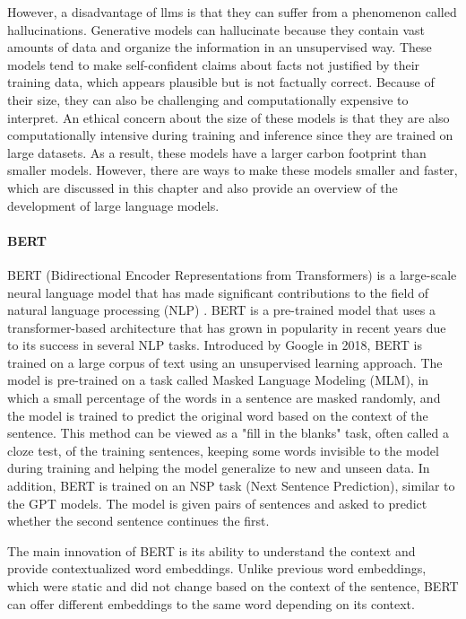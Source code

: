    
    However, a disadvantage of \glspl{llm} is that they can suffer from a phenomenon called hallucinations. Generative models can hallucinate because they contain vast amounts of data and organize the information in an unsupervised way. These models tend to make self-confident claims about facts not justified by their training data, which appears plausible but is not factually correct. Because of their size, they can also be challenging and computationally expensive to interpret. An ethical concern about the size of these models is that they are also computationally intensive during training and inference since they are trained on large datasets. As a result, these models have a larger carbon footprint than smaller models. However, there are ways to make these models smaller and faster, which are discussed in this chapter and also provide an overview of the development of large language models.

   

    \paragraph{BERT\\}

    BERT (Bidirectional Encoder Representations from Transformers) is a large-scale neural language model that has made significant contributions to the field of natural language processing (NLP) \cite{devlinBERTPretrainingDeep2019}. BERT is a pre-trained model that uses a transformer-based architecture that has grown in popularity in recent years due to its success in several NLP tasks. Introduced by Google in 2018, BERT is trained on a large corpus of text using an unsupervised learning approach. The model is pre-trained on a task called Masked Language Modeling (MLM), in which a small percentage of the words in a sentence are masked randomly, and the model is trained to predict the original word based on the context of the sentence. This method can be viewed as a "fill in the blanks" task, often called a cloze test, of the training sentences, keeping some words invisible to the model during training and helping the model generalize to new and unseen data. In addition, BERT is trained on an NSP task (Next Sentence Prediction), similar to the GPT models. The model is given pairs of sentences and asked to predict whether the second sentence continues the first.

    The main innovation of BERT is its ability to understand the context and provide contextualized word embeddings. Unlike previous word embeddings, which were static and did not change based on the context of the sentence, BERT can offer different embeddings to the same word depending on its context.
    
